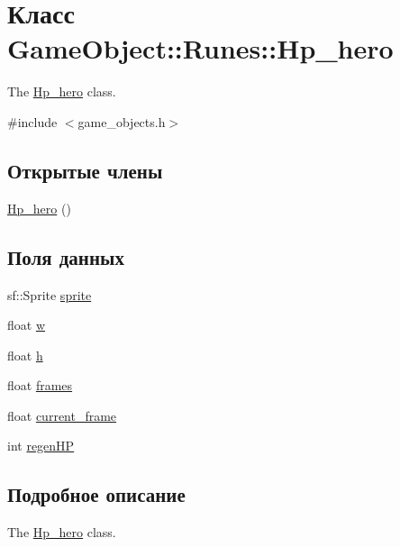 \hypertarget{classGameObject_1_1Runes_1_1Hp__hero}{}\section{Класс Game\+Object\+:\+:Runes\+:\+:Hp\+\_\+hero}
\label{classGameObject_1_1Runes_1_1Hp__hero}


The \hyperlink{classGameObject_1_1Runes_1_1Hp__hero}{Hp\+\_\+hero} class.  




{\ttfamily \#include $<$game\+\_\+objects.\+h$>$}

\subsection*{Открытые члены}
\begin{DoxyCompactItemize}
\item 
\hyperlink{classGameObject_1_1Runes_1_1Hp__hero_a05e22228414e0343e27562973532359d}{Hp\+\_\+hero} ()
\end{DoxyCompactItemize}
\subsection*{Поля данных}
\begin{DoxyCompactItemize}
\item 
sf\+::\+Sprite \hyperlink{classGameObject_1_1Runes_1_1Hp__hero_ad32b6f46b52b116b6ec935db8b3354cd}{sprite}
\item 
float \hyperlink{classGameObject_1_1Runes_1_1Hp__hero_a52771269c044c6bffb526375ce99e40d}{w}
\item 
float \hyperlink{classGameObject_1_1Runes_1_1Hp__hero_ae8a7c6ed63ded9894eb0dd5e64f4bd6e}{h}
\item 
float \hyperlink{classGameObject_1_1Runes_1_1Hp__hero_a82d8e6e0510f203abe8b567722569b02}{frames}
\item 
float \hyperlink{classGameObject_1_1Runes_1_1Hp__hero_a64ca597b8a89a8462b3b133ab1ef09a9}{current\+\_\+frame}
\item 
int \hyperlink{classGameObject_1_1Runes_1_1Hp__hero_a65e05a2e7adac76e73c3543bfc132395}{regen\+HP}
\end{DoxyCompactItemize}


\subsection{Подробное описание}
The \hyperlink{classGameObject_1_1Runes_1_1Hp__hero}{Hp\+\_\+hero} class. 

